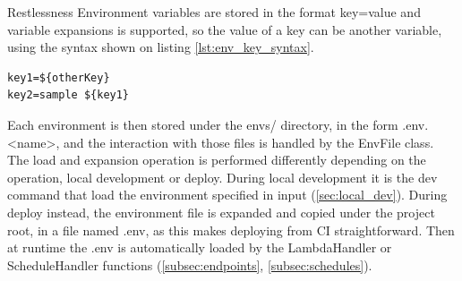\begin{chapter}{Restlessness}
    Environment variables are stored in the format key=value and variable expansions
    is supported, so the value of a key can be another variable, using the syntax
    shown on listing \ref{lst:env_key_syntax}.

    \begin{lstlisting}[caption=Environment variable syntax, label={lst:env_key_syntax}]
key1=${otherKey}
key2=sample ${key1}
    \end{lstlisting}

    Each environment is then stored under the envs/ directory, in the form .env.<name>,
    and the interaction with those files is handled by the EnvFile class.
    The load and expansion operation is performed differently depending on the operation,
    local development or deploy.
    During local development it is the dev command that load the environment specified
    in input (\ref{sec:local_dev}).
    During deploy instead, the environment file is expanded and copied under the
    project root, in a file named .env, as this makes deploying from CI straightforward.
    Then at runtime the .env is automatically loaded by the LambdaHandler or ScheduleHandler
    functions (\ref{subsec:endpoints}, \ref{subsec:schedules}).

\end{chapter}